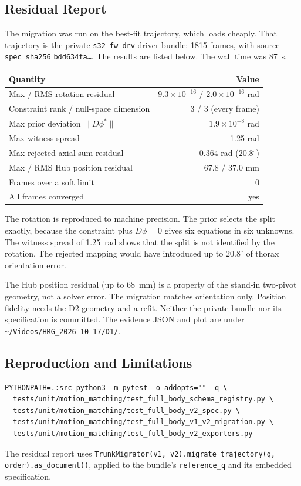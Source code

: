 \documentclass[11pt,a4paper]{article}
\begin{document}
\subsection{Residual Report}
The migration was run on the best-fit trajectory, which loads cheaply. That
trajectory is the private \texttt{s32-fw-drv} driver bundle: 1815 frames, with
source \texttt{spec\_sha256} \texttt{bdd634fa\ldots}. The results are listed
below. The wall time was 87~s.
\begin{center}
\begin{tabular}{lr}
Quantity & Value \\
\hline
Max / RMS rotation residual & $9.3\times10^{-16}$ / $2.0\times10^{-16}$ rad \\
Constraint rank / null-space dimension & 3 / 3 (every frame) \\
Max prior deviation $\lVert D\phi^\ast\rVert$ & $1.9\times10^{-8}$ rad \\
Max witness spread & 1.25 rad \\
Max rejected axial-sum residual & 0.364 rad (20.8$^\circ$) \\
Max / RMS Hub position residual & 67.8 / 37.0 mm \\
Frames over a soft limit & 0 \\
All frames converged & yes \\
\end{tabular}
\end{center}
The rotation is reproduced to machine precision. The prior selects the split
exactly, because the constraint plus $D\phi=0$ gives six equations in six
unknowns. The witness spread of 1.25~rad shows that the split is not
identified by the rotation. The rejected mapping would have introduced up to
$20.8^\circ$ of thorax orientation error.

The Hub position residual (up to 68~mm) is a property of the stand-in two-pivot
geometry, not a solver error. The migration matches orientation only. Position
fidelity needs the D2 geometry and a refit. Neither the private bundle nor its
specification is committed. The evidence JSON and plot are under
\texttt{\textasciitilde/Videos/HRG\_2026-10-17/D1/}.

\subsection{Reproduction and Limitations}
\begin{verbatim}
PYTHONPATH=.:src python3 -m pytest -o addopts="" -q \
  tests/unit/motion_matching/test_full_body_schema_registry.py \
  tests/unit/motion_matching/test_full_body_v2_spec.py \
  tests/unit/motion_matching/test_full_body_v1_v2_migration.py \
  tests/unit/motion_matching/test_full_body_v2_exporters.py
\end{verbatim}
The residual report uses \texttt{TrunkMigrator(v1, v2).migrate\_trajectory(q,
order).as\_document()}, applied to the bundle's \texttt{reference\_q} and its
embedded specification.
\end{document}
